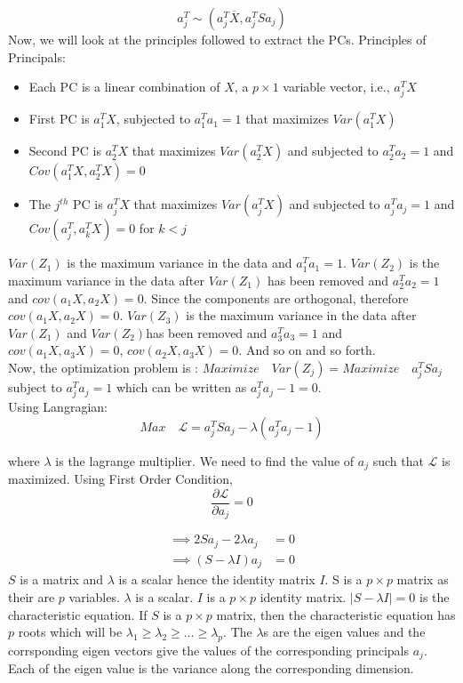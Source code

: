\documentclass[12pt,a4paper]{report}
\begin{document}
\begin{equation}
a_j^T \sim ( a_j^T  \overline X, a_j^T S a_j )
\end{equation}
Now, we will look at the principles followed to extract the PCs.
Principles of Principals:
\begin{itemize}
\item Each PC  is a linear combination of $X$, a $p \times 1 $ variable vector, i.e., $a_j^T X$
\item First PC is $a_1^T X$, subjected to $a_1^T a_1 = 1$ that maximizes $Var(a_1^T X)$
\item Second PC is $a_2^T X$ that maximizes $Var(a_2^T X)$ and  subjected to $a_2^T a_2 = 1$  and $Cov(a_1^T X, a_2^T X) = 0$
\item The $j^{th}$ PC is  $a_j^T X$ that maximizes $Var(a_j^T X)$ and subjected to $a_j^T a_j = 1$  and $Cov(a_j^T, a_k^T X) = 0$ for $k < j$
\end{itemize}
$Var(Z_1)$ is the maximum variance in the data and $a_1^T a_1 = 1$. $Var(Z_2)$ is the maximum variance in the data after $Var(Z_1)$ has been removed and $a_2^T a_2 = 1$ and $cov(a_1 X, a_2 X ) = 0$. Since the components are orthogonal, therefore $cov(a_1 X, a_2 X ) = 0$. $Var(Z_3)$ is the maximum variance in the data after $Var(Z_1)$ and $Var(Z_2)$has been removed and $a_3^T a_3 = 1$ and $cov(a_1 X, a_3 X ) = 0$, $cov(a_2 X, a_3 X ) = 0$. And so on and so forth. \\
Now, the optimization problem is :
 $Maximize \quad Var(Z_j) = Maximize \quad a_j^T S a_j$ subject to $a_j^T  a_j = 1$ which can be written as $a_j^T  a_j - 1 = 0$.\\
 Using Langragian:
 \begin{equation}
 Max \quad \mathcal L = a_j^T S a_j - \lambda (a_j^T  a_j - 1)
 \end{equation}
 
 where $\lambda$ is the lagrange multiplier. We need to find the value of $a_j$ such that $\mathcal L $ is maximized. Using First Order Condition, 
 \begin{equation}
 \frac{\partial \mathcal L}{\partial a_j} = 0
 \end{equation}

 \begin{align}
  \implies 2 S a_j -2 \lambda a_j & = 0 \\
 \implies (S - \lambda I) a_j & = 0
 \end{align}
 $S$ is a matrix and $\lambda$ is a scalar hence the identity matrix $I$. S is a $p \times p $ matrix as their are $p$ variables. $\lambda$ is a scalar. $I$ is a  $p \times p $ identity matrix. $|S - \lambda I| = 0$ is the characteristic equation. If $S$ is a $p \times p $ matrix, then the characteristic equation has $p$ roots which will be $\lambda_1 \geq \lambda_2 \geq \dots \geq \lambda_p $. The  $\lambda$s are the eigen values and the corrsponding eigen vectors give the values of the corresponding principals $a_j$. Each of the eigen value is the variance along the corresponding dimension. 
\end{document}
